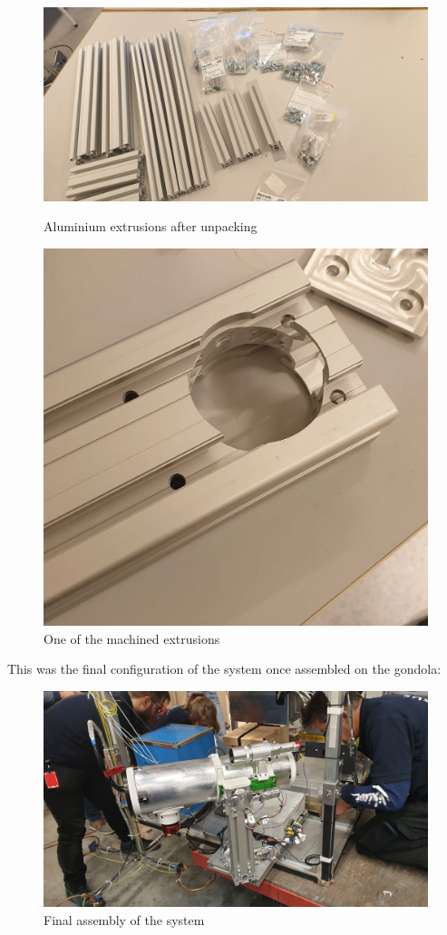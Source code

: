 \begin{figure}[H]
	\centering
	\begin{minipage}[t]{0.4\linewidth}
		\centering
		\includegraphics[width=1\linewidth]{4-experiment-design/img/mechanical/extr.jpg}
		\caption{Aluminium extrusions after unpacking}
		\label{fig::mechanical::extrusions}
	\end{minipage}
	\hspace{0.05\linewidth}
	\begin{minipage}[t]{0.4\linewidth}
		\centering
		\includegraphics[width=0.65\linewidth]{4-experiment-design/img/mechanical/ext-mach.jpg}
		\caption{One of the machined extrusions}
		\label{fig::mechanical::mach-extr}
	\end{minipage}
\end{figure}

\newpage
This was the final configuration of the system once assembled on the gondola:

\begin{figure}[H]
	\centering
	\includegraphics[width=\textwidth]{4-experiment-design/img/mechanical/assembled.jpg}
	\caption{Final assembly of the system}
	\label{fig::mechanical::assy}
\end{figure}
